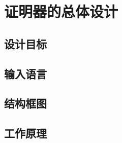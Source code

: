 \chapter{证明器的总体设计}
\label{chap:struct}

\section{设计目标}

\section{输入语言}

\section{结构框图}

\section{工作原理}


